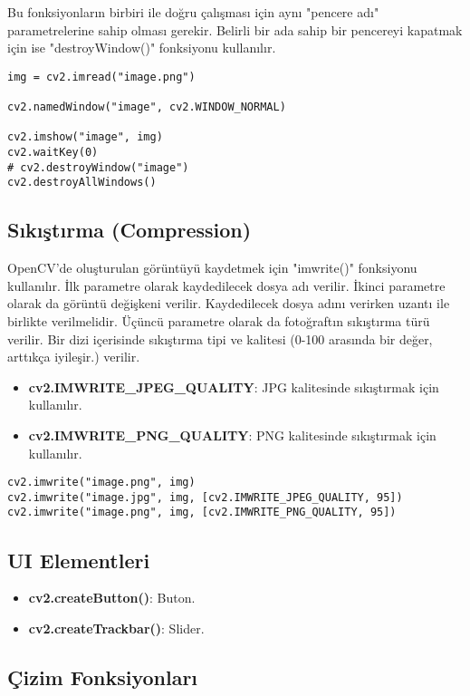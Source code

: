 Bu fonksiyonların birbiri ile doğru çalışması için aynı "pencere adı" parametrelerine sahip olması gerekir. Belirli bir ada sahip bir pencereyi kapatmak için ise "destroyWindow()" fonksiyonu kullanılır.

\begin{lstlisting}
img = cv2.imread("image.png")

cv2.namedWindow("image", cv2.WINDOW_NORMAL)

cv2.imshow("image", img)
cv2.waitKey(0)
# cv2.destroyWindow("image")
cv2.destroyAllWindows()
\end{lstlisting}

\subsection{Sıkıştırma (Compression)}
OpenCV'de oluşturulan görüntüyü kaydetmek için "imwrite()" fonksiyonu kullanılır. İlk parametre olarak kaydedilecek dosya adı verilir. İkinci parametre olarak da görüntü değişkeni verilir. Kaydedilecek dosya adını verirken uzantı ile birlikte verilmelidir. Üçüncü parametre olarak da fotoğraftın sıkıştırma türü verilir. Bir dizi içerisinde sıkıştırma tipi ve kalitesi (0-100 arasında bir değer, arttıkça iyileşir.) verilir.
\begin{itemize}
	\item \textbf{cv2.IMWRITE\_JPEG\_QUALITY}: JPG kalitesinde sıkıştırmak için kullanılır.
	\item \textbf{cv2.IMWRITE\_PNG\_QUALITY}: PNG kalitesinde sıkıştırmak için kullanılır.
\end{itemize}

\begin{lstlisting}
cv2.imwrite("image.png", img)
cv2.imwrite("image.jpg", img, [cv2.IMWRITE_JPEG_QUALITY, 95])
cv2.imwrite("image.png", img, [cv2.IMWRITE_PNG_QUALITY, 95])
\end{lstlisting}

\subsection{UI Elementleri}

\begin{itemize}
	\item \textbf{cv2.createButton()}: Buton.
	\item \textbf{cv2.createTrackbar()}: Slider.
\end{itemize}

\subsection{Çizim Fonksiyonları}
